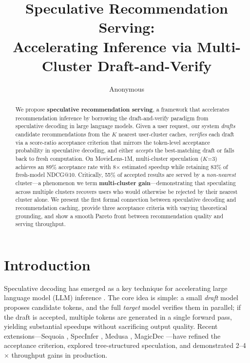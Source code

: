 \documentclass{article}
\title{Speculative Recommendation Serving:\\Accelerating Inference via Multi-Cluster Draft-and-Verify}
\author{Anonymous}
\begin{document}
\maketitle

\begin{abstract}
We propose \textbf{speculative recommendation serving}, a framework that accelerates recommendation inference by borrowing the draft-and-verify paradigm from speculative decoding in large language models. Given a user request, our system \emph{drafts} candidate recommendations from the $K$ nearest user-cluster caches, \emph{verifies} each draft via a score-ratio acceptance criterion that mirrors the token-level acceptance probability in speculative decoding, and either \emph{accepts} the best-matching draft or falls back to fresh computation. On MovieLens-1M, multi-cluster speculation ($K$=3) achieves an 89\% acceptance rate with 8$\times$ estimated speedup while retaining 83\% of fresh-model NDCG@10. Critically, 55\% of accepted results are served by a \emph{non-nearest} cluster---a phenomenon we term \textbf{multi-cluster gain}---demonstrating that speculating across multiple clusters recovers users who would otherwise be rejected by their nearest cluster alone. We present the first formal connection between speculative decoding and recommendation caching, provide three acceptance criteria with varying theoretical grounding, and show a smooth Pareto front between recommendation quality and serving throughput.
\end{abstract}

\section{Introduction}

Speculative decoding has emerged as a key technique for accelerating large language model (LLM) inference \citep{leviathan2023, chen2023speculative}. The core idea is simple: a small \emph{draft} model proposes candidate tokens, and the full \emph{target} model verifies them in parallel; if the draft is accepted, multiple tokens are generated in a single forward pass, yielding substantial speedups without sacrificing output quality. Recent extensions---Sequoia \citep{sequoia2024}, SpecInfer \citep{specinfer2024}, Medusa \citep{medusa2024}, MagicDec \citep{magicdec2024}---have refined the acceptance criterion, explored tree-structured speculation, and demonstrated 2--4$\times$ throughput gains in production.
\end{document}
